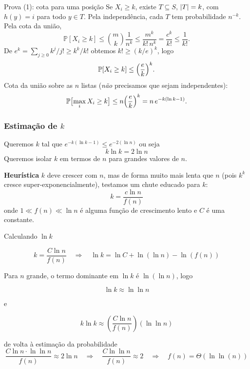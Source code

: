 \documentclass[aspectratio=169,11pt]{beamer}
\newcommand{\PP}{\mathbb P}
\begin{document}
\begin{frame}{Prova (1): cota para uma posição}
  Se $X_i\ge k$, existe $T\subseteq S$, $\lvert T\rvert=k$, com $h(y)=i$ para
  todo $y\in T$. Pela independência, cada $T$ tem probabilidade
  $n^{-k}$. Pela cota da união,
  \[
    \PP[X_i\ge k]\le\binom mk\frac1{n^k}\le\frac{m^k}{k!\,n^k}
    =\frac{c^k}{k!}\le\frac1{k!}.
  \]
  \pause
  De $e^k=\sum_{j\ge0}k^j/j!\ge k^k/k!$ obtemos $k!\ge(k/e)^k$, logo
  \[
    \PP[X_i\ge k]\le\Bigl(\frac ek\Bigr)^k.
  \]
  \pause
  Cota da união sobre as $n$ listas (\emph{não} precisamos que sejam
  independentes):
  \[
    \PP\bigl[\max_iX_i\ge k\bigr]\le n\Bigl(\frac ek\Bigr)^k
    =n\,e^{-k(\ln k-1)}.
  \]
\end{frame}
\begin{frame}
  \frametitle{Estimação de $k$}

  Queremos $k$ tal que $ e^{-k(\ln k-1)} \le e^{-2(\ln n)}$
  ou seja 
  \[
    k \ln k = 2 \ln n
  \]
  Queremos isolar $k$ em termos de $n$ para grandes valores de $n$.

  \bigskip

  \textbf{Heurística} $k$ deve crescer com $n$, mas de forma muito mais
  lenta que $n$ (pois $k^k$ cresce super-exponencialmente), testamos
  um chute educado para $k$:
  \[
    k = \frac{c \ln n}{f(n)}
  \]
  onde $1\ll f(n)\ll \ln n$ é alguma função de crescimento lento e $C$
  é uma constante.
\end{frame}
\begin{frame} {Calculando $\ln k$}

\[
  k = \dfrac{C \ln n}{f(n)} \quad\Longrightarrow\quad
  \ln k 
  = \ln C + \ln(\ln n) - \ln(f(n))
\]

Para $n$ grande, o termo dominante em $\ln k$ é $\ln(\ln n)$, logo

\[
  \ln k \approx \ln \ln n
\]

e

\[
k \ln k \approx \left( \frac{C \ln n}{f(n)} \right) (\ln \ln n)
\]

de volta à estimação da probabilidade
\[
  \frac{C \ln n \cdot \ln \ln n}{f(n)} \approx 2 \ln n
  \quad\Longrightarrow\quad
  \frac{C \ln \ln n}{f(n)} \approx 2
  \quad\Longrightarrow\quad
  f(n) = \Theta (\ln\ln(n))
\]
\end{frame}
\end{document}
